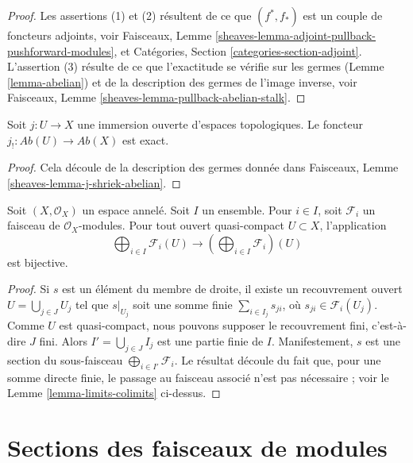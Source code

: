 \begin{proof}
Les assertions (1) et (2) résultent de ce que $(f^*, f_*)$ est un couple de
foncteurs adjoints, voir Faisceaux, Lemme
\ref{sheaves-lemma-adjoint-pullback-pushforward-modules}, et Catégories,
Section \ref{categories-section-adjoint}. L'assertion (3) résulte de ce que
l'exactitude se vérifie sur les germes (Lemme \ref{lemma-abelian}) et de la
description des germes de l'image inverse, voir Faisceaux, Lemme
\ref{sheaves-lemma-pullback-abelian-stalk}.
\end{proof}

\begin{lemma}
\label{lemma-j-shriek-exact}
Soit $j : U \to X$ une immersion ouverte d'espaces topologiques. Le foncteur
$j_! : \textit{Ab}(U) \to \textit{Ab}(X)$ est exact.
\end{lemma}

\begin{proof}
Cela découle de la description des germes donnée dans Faisceaux, Lemme
\ref{sheaves-lemma-j-shriek-abelian}.
\end{proof}

\begin{lemma}
\label{lemma-section-direct-sum-quasi-compact}
Soit $(X, \mathcal{O}_X)$ un espace annelé. Soit $I$ un ensemble. Pour
$i \in I$, soit $\mathcal{F}_i$ un faisceau de $\mathcal{O}_X$-modules.
Pour tout ouvert quasi-compact $U \subset X$, l'application
$$
\bigoplus\nolimits_{i \in I} \mathcal{F}_i(U)
\longrightarrow
\left(\bigoplus\nolimits_{i \in I} \mathcal{F}_i\right)(U)
$$
est bijective.
\end{lemma}

\begin{proof}
Si $s$ est un élément du membre de droite, il existe un recouvrement ouvert
$U = \bigcup_{j \in J} U_j$ tel que $s|_{U_j}$ soit une somme finie
$\sum_{i \in I_j} s_{ji}$, où $s_{ji} \in \mathcal{F}_i(U_j)$. Comme $U$
est quasi-compact, nous pouvons supposer le recouvrement fini, c'est-à-dire
$J$ fini. Alors $I' = \bigcup_{j \in J} I_j$ est une partie finie de $I$.
Manifestement, $s$ est une section du sous-faisceau
$\bigoplus_{i \in I'} \mathcal{F}_i$. Le résultat découle du fait que, pour
une somme directe finie, le passage au faisceau associé n'est pas nécessaire ;
voir le Lemme \ref{lemma-limits-colimits} ci-dessus.
\end{proof}



\section{Sections des faisceaux de modules}
\label{section-sections}

